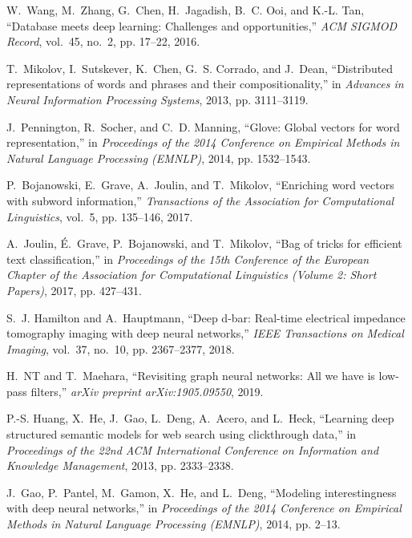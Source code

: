 \documentclass[conference]{IEEEtran}
\begin{document}
\begin{thebibliography}{10}
	W.~Wang, M.~Zhang, G.~Chen, H.~Jagadish, B.~C. Ooi, and K.-L. Tan, ``Database
	meets deep learning: Challenges and opportunities,'' \emph{ACM SIGMOD
		Record}, vol.~45, no.~2, pp. 17--22, 2016.
	
	T.~Mikolov, I.~Sutskever, K.~Chen, G.~S. Corrado, and J.~Dean, ``Distributed
	representations of words and phrases and their compositionality,'' in
	\emph{Advances in Neural Information Processing Systems}, 2013, pp.
	3111--3119.
	
	J.~Pennington, R.~Socher, and C.~D. Manning, ``Glove: Global vectors for word
	representation,'' in \emph{Proceedings of the 2014 Conference on Empirical
		Methods in Natural Language Processing (EMNLP)}, 2014, pp. 1532--1543.
	
	P.~Bojanowski, E.~Grave, A.~Joulin, and T.~Mikolov, ``Enriching word vectors
	with subword information,'' \emph{Transactions of the Association for
		Computational Linguistics}, vol.~5, pp. 135--146, 2017.
	
	A.~Joulin, {\'E}.~Grave, P.~Bojanowski, and T.~Mikolov, ``Bag of tricks for
	efficient text classification,'' in \emph{Proceedings of the 15th Conference
		of the European Chapter of the Association for Computational Linguistics
		(Volume 2: Short Papers)}, 2017, pp. 427--431.
	
	S.~J. Hamilton and A.~Hauptmann, ``Deep d-bar: Real-time electrical impedance
	tomography imaging with deep neural networks,'' \emph{IEEE Transactions on
		Medical Imaging}, vol.~37, no.~10, pp. 2367--2377, 2018.
	
	H.~NT and T.~Maehara, ``Revisiting graph neural networks: All we have is
	low-pass filters,'' \emph{arXiv preprint arXiv:1905.09550}, 2019.
	
	P.-S. Huang, X.~He, J.~Gao, L.~Deng, A.~Acero, and L.~Heck, ``Learning deep
	structured semantic models for web search using clickthrough data,'' in
	\emph{Proceedings of the 22nd ACM International Conference on Information and
		Knowledge Management}, 2013, pp. 2333--2338.
	
	J.~Gao, P.~Pantel, M.~Gamon, X.~He, and L.~Deng, ``Modeling interestingness
	with deep neural networks,'' in \emph{Proceedings of the 2014 Conference on
		Empirical Methods in Natural Language Processing (EMNLP)}, 2014, pp. 2--13.
	

\end{thebibliography}
\end{document}
